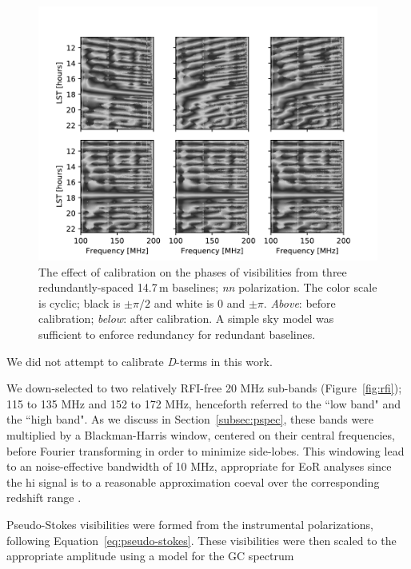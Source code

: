 \documentclass[twocolumn, trackchanges]{aastex61}
\begin{document}
\begin{figure}
\centering
\includegraphics[scale=0.6]{phases_pre_post_abscal_h19_cyclic_grey.pdf}
\caption{The effect of calibration on the phases of visibilities from three redundantly-spaced 14.7\,m baselines; \textit{nn} polarization. The color scale is cyclic; black is $\pm\pi/2$ and white is 0 and $\pm\pi$. \textit{Above}: before calibration; \textit{below}: after calibration. A simple sky model was sufficient to enforce redundancy for redundant baselines.}
\label{fig:phasecal}
\end{figure}

We did not attempt to calibrate \textit{D}-terms in this work.

We down-selected to two relatively RFI-free 20 MHz sub-bands (Figure~\ref{fig:rfi}); 115 to 135 MHz and 152 to 172 MHz, henceforth referred to the ``low band" and the ``high band". As we discuss in Section~\ref{subsec:pspec}, these bands were multiplied by a Blackman-Harris window, centered on their central frequencies, before Fourier transforming in order to minimize side-lobes. This windowing lead to an noise-effective bandwidth of 10 MHz, appropriate for EoR analyses since the {\sc hi} signal is to a reasonable approximation coeval over the corresponding redshift range \citep{Furlanetto06}.

Pseudo-Stokes visibilities were formed from the instrumental polarizations, following Equation~\ref{eq:pseudo-stokes}. These visibilities were then scaled to the appropriate amplitude using a model for the GC spectrum 
\end{document}
